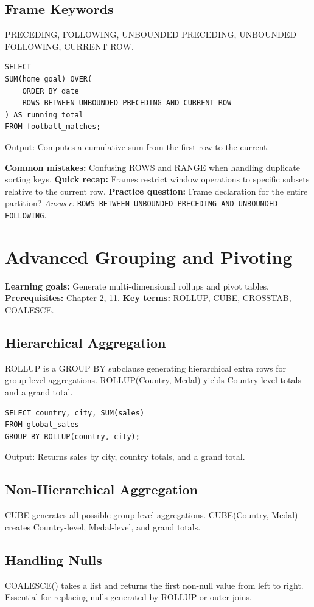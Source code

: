 \documentclass[12pt, a4paper]{article}
\begin{document}
\subsection{Frame Keywords}
PRECEDING, FOLLOWING, UNBOUNDED PRECEDING, UNBOUNDED FOLLOWING, CURRENT ROW.

\begin{verbatim}
SELECT 
SUM(home_goal) OVER(
    ORDER BY date 
    ROWS BETWEEN UNBOUNDED PRECEDING AND CURRENT ROW
) AS running_total
FROM football_matches;
\end{verbatim}
Output: Computes a cumulative sum from the first row to the current.

\textbf{Common mistakes:} Confusing ROWS and RANGE when handling duplicate sorting keys.
\textbf{Quick recap:} Frames restrict window operations to specific subsets relative to the current row.
\textbf{Practice question:} Frame declaration for the entire partition?
\textit{Answer:} \texttt{ROWS BETWEEN UNBOUNDED PRECEDING AND UNBOUNDED FOLLOWING}.

\section{Advanced Grouping and Pivoting}
\textbf{Learning goals:} Generate multi-dimensional rollups and pivot tables.
\textbf{Prerequisites:} Chapter 2, 11.
\textbf{Key terms:} ROLLUP, CUBE, CROSSTAB, COALESCE.

\subsection{Hierarchical Aggregation}
ROLLUP is a GROUP BY subclause generating hierarchical extra rows for group-level aggregations. ROLLUP(Country, Medal) yields Country-level totals and a grand total.

\begin{verbatim}
SELECT country, city, SUM(sales)
FROM global_sales
GROUP BY ROLLUP(country, city);
\end{verbatim}
Output: Returns sales by city, country totals, and a grand total.

\subsection{Non-Hierarchical Aggregation}
CUBE generates all possible group-level aggregations. CUBE(Country, Medal) creates Country-level, Medal-level, and grand totals.

\subsection{Handling Nulls}
COALESCE() takes a list and returns the first non-null value from left to right. Essential for replacing nulls generated by ROLLUP or outer joins.
\end{document}
